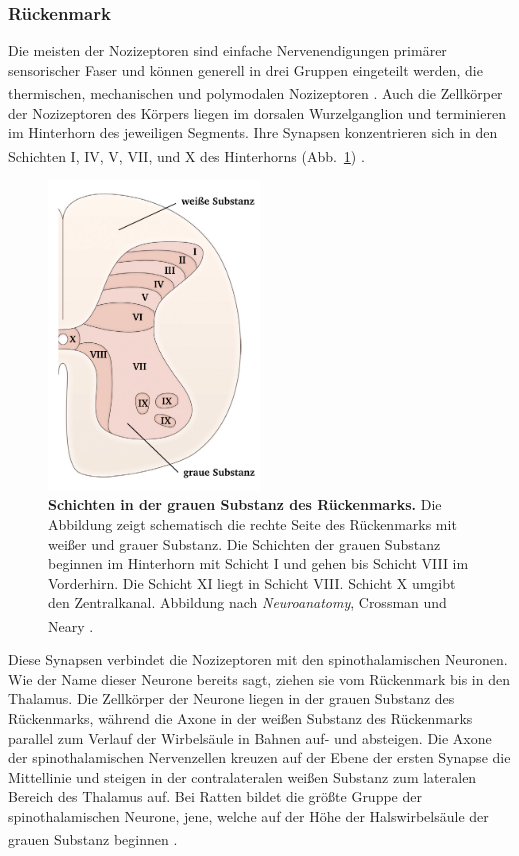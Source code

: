 \documentclass[12pt,a4paper,pdftex]{article}
\begin{document}
\subsubsection*{Rückenmark}

Die meisten der Nozizeptoren  sind einfache Nervenendigungen primärer sensorischer Faser und können generell in drei Gruppen eingeteilt werden, die thermischen, mechanischen und polymodalen Nozizeptoren \textsuperscript{\cite[24]{kandel2013principles}}. Auch die Zellkörper der Nozizeptoren des Körpers liegen im dorsalen Wurzelganglion und terminieren im Hinterhorn des jeweiligen Segments. Ihre Synapsen konzentrieren sich in den Schichten I, IV, V, VII, und X des Hinterhorns (Abb.~\ref{fig:graymatter}) \textsuperscript{\cite[25]{paxinos2014rat}}.

\begin{figure}[H]
        \centering
        \includegraphics[width = 0.5\textwidth]
        {pictures/somatosensory/gray_matter.png}
        \caption[Schichten in der grauen Substanz des Rückenmarks]{\textbf{Schichten in der grauen Substanz des Rückenmarks.} Die Abbildung zeigt schematisch die rechte Seite des Rückenmarks mit weißer und grauer Substanz. Die Schichten der grauen Substanz beginnen im Hinterhorn mit Schicht I und gehen bis Schicht VIII im Vorderhirn. Die Schicht XI liegt in Schicht VIII. Schicht X umgibt den Zentralkanal. Abbildung nach \textit{Neuroanatomy}, Crossman und Neary
        \textsuperscript{\cite[8]{crossman2014neuroanatomy}}.}
        \label{fig:graymatter}
    \end{figure}

\newpage
Diese Synapsen verbindet die Nozizeptoren mit den spinothalamischen Neuronen. Wie der Name dieser Neurone bereits sagt, ziehen sie vom Rückenmark bis in den Thalamus. Die Zellkörper der Neurone liegen in der grauen Substanz des Rückenmarks, während die Axone in der weißen Substanz des Rückenmarks parallel zum Verlauf der Wirbelsäule in Bahnen auf- und absteigen. Die Axone der spinothalamischen Nervenzellen kreuzen auf der Ebene der ersten Synapse die Mittellinie und steigen in der contralateralen weißen Substanz zum lateralen Bereich des Thalamus auf. Bei Ratten bildet die größte Gruppe der spinothalamischen Neurone, jene, welche auf der Höhe der Halswirbelsäule der grauen Substanz beginnen \textsuperscript{\cite[25]{paxinos2014rat}}.
\end{document}
